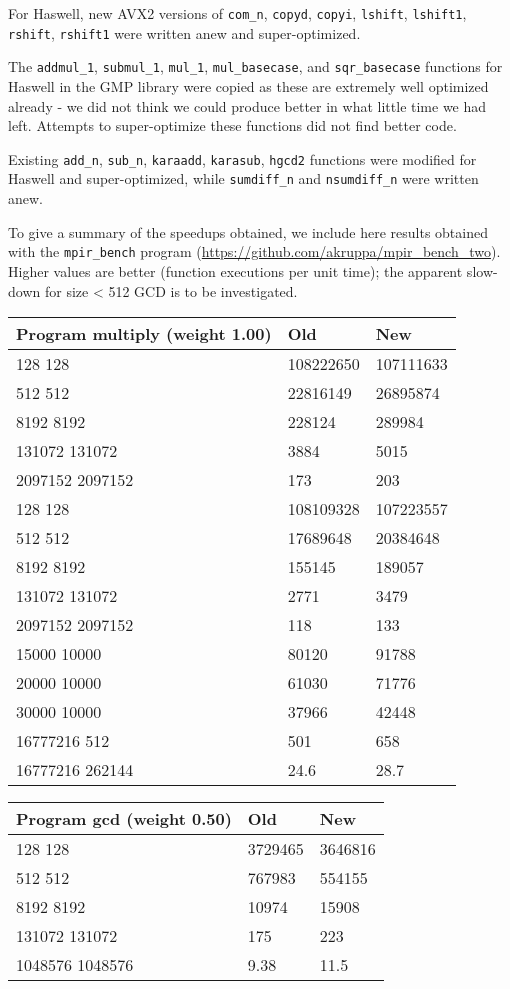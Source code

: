 For Haswell, new AVX2 versions of \texttt{com\_n}, \texttt{copyd},
\texttt{copyi}, \texttt{lshift}, \texttt{lshift1}, \texttt{rshift},
\texttt{rshift1} were written anew and super-optimized.

The \texttt{addmul\_1}, \texttt{submul\_1}, \texttt{mul\_1},
\texttt{mul\_basecase}, and \texttt{sqr\_basecase} functions for Haswell
in the GMP library were copied as these are extremely well optimized
already - we did not think we could produce better in what little time
we had left. Attempts to super-optimize these functions did not find
better code.

Existing \texttt{add\_n}, \texttt{sub\_n}, \texttt{karaadd},
\texttt{karasub}, \texttt{hgcd2} functions were modified for Haswell and
super-optimized, while \texttt{sumdiff\_n} and \texttt{nsumdiff\_n} were
written anew.

To give a summary of the speedups obtained, we include here results
obtained with the \texttt{mpir\_bench} program
(\url{https://github.com/akruppa/mpir_bench_two}). Higher values are
better (function executions per unit time); the apparent slow-down for
size \textless{} 512 GCD is to be investigated.

\begin{longtable}[c]{@{}lll@{}}
\toprule
Program multiply (weight 1.00) & Old & New\tabularnewline
\midrule
\endhead
128 128 & 108222650 & 107111633\tabularnewline
512 512 & 22816149 & 26895874\tabularnewline
8192 8192 & 228124 & 289984\tabularnewline
131072 131072 & 3884 & 5015\tabularnewline
2097152 2097152 & 173 & 203\tabularnewline
128 128 & 108109328 & 107223557\tabularnewline
512 512 & 17689648 & 20384648\tabularnewline
8192 8192 & 155145 & 189057\tabularnewline
131072 131072 & 2771 & 3479\tabularnewline
2097152 2097152 & 118 & 133\tabularnewline
15000 10000 & 80120 & 91788\tabularnewline
20000 10000 & 61030 & 71776\tabularnewline
30000 10000 & 37966 & 42448\tabularnewline
16777216 512 & 501 & 658\tabularnewline
16777216 262144 & 24.6 & 28.7\tabularnewline
\bottomrule
\end{longtable}

\begin{longtable}[c]{@{}lll@{}}
\toprule
Program gcd (weight 0.50) & Old & New\tabularnewline
\midrule
\endhead
128 128 & 3729465 & 3646816\tabularnewline
512 512 & 767983 & 554155\tabularnewline
8192 8192 & 10974 & 15908\tabularnewline
131072 131072 & 175 & 223\tabularnewline
1048576 1048576 & 9.38 & 11.5\tabularnewline
\bottomrule
\end{longtable}

